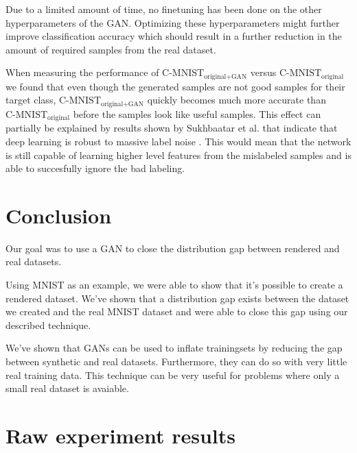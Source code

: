 \documentclass[10pt,twocolumn,letterpaper]{article}
\begin{document}
Due to a limited amount of time, no finetuning has been done on the other hyperparameters of the GAN. Optimizing these hyperparameters might further improve classification accuracy which should result in a further reduction in the amount of required samples from the real dataset.

When measuring the performance of $\text{C-MNIST}_\text{original+GAN}$ versus $\text{C-MNIST}_\text{original}$ we found that even though the generated samples are not good samples for their target class, $\text{C-MNIST}_\text{original+GAN}$ quickly becomes much more accurate than $\text{C-MNIST}_\text{original}$ before the samples look like useful samples. This effect can partially be explained by results shown by Sukhbaatar et al. that indicate that deep learning is robust to massive label noise \cite{Sukhbaatar2014TrainingCN}. This would mean that the network is still capable of learning higher level features from the mislabeled samples and is able to succesfully ignore the bad labeling.


\section{Conclusion}
Our goal was to use a GAN to close the distribution gap between rendered and real datasets. 

Using MNIST as an example, we were able to show that it's possible to create a rendered dataset. We've shown that a distribution gap exists between the dataset we created and the real MNIST dataset and were able to close this gap using our described technique.

We've shown that GANs can be used to inflate trainingsets by reducing the gap between synthetic and real datasets. Furthermore, they can do so with very little real training data. This technique can be very useful for problems where only a small real dataset is avaiable.

{\small


}

\onecolumn
\appendix

\section{Raw experiment results}
\begin{longtable}{ | l | l | l | l | l | l | l | }
	\hline
	
\end{longtable}
\end{document}
